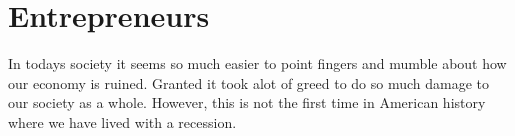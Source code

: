 \message{ !name(EC320-WK3-3.5.3.tex)}\documentclass[pdftex,12pt,a4paper]{report}
\begin{document}
\section{Entrepreneurs}
\begin{doublespace}
In todays society it seems so much easier to point fingers and mumble about how our economy is ruined. Granted it took alot of greed to do so much damage to our society as a whole. However, this is not the first time in American history where we have lived with a recession. 
\end{doublespace} 
\clearpage
    \nocite{*}
    
    
\end{document}
